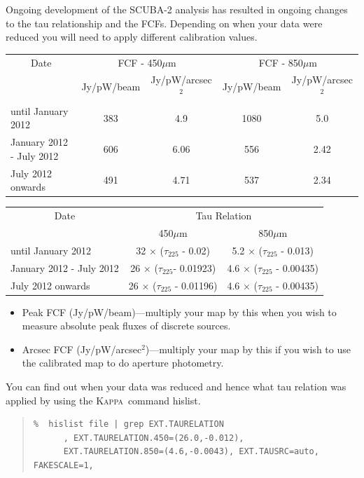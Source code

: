 \documentclass[twoside,11pt]{article}
\newcommand{\xref}[3]{#1}
\renewcommand{\_}{\texttt{\symbol{95}}}
\newenvironment{myquote}{
   \color{MidnightBlue}\begin{quote}\begin{small}}{
   \end{small}\end{quote}
}
\newcommand{\Kappa}{\xref{\textsc{Kappa}}{sun95}{}}
\newcommand{\task}[1]{\textsf{#1}}
\newcommand{\hislist}{\xref{\task{hislist}}{sun95}{HISLIST}}
\renewenvironment{myquote}{
      \begin{quote}\begin{small}}{
      \end{small}\end{quote}
   }
\begin{document}
Ongoing development of the SCUBA-2 analysis has resulted in ongoing
changes to the tau relationship and the FCFs. Depending on when your
data were reduced you will need to apply different calibration values.
\\
\begin{table}[h!]
\begin{center}
\begin{tabular}{|l|c|c|c|c|}
 \hline
 \multicolumn{1}{|c|}{Date} &
 \multicolumn{2}{c|}{FCF - 450$\mu$m} &
 \multicolumn{2}{c|}{FCF - 850$\mu$m} \\
\cline{2-5}
& Jy/pW/beam &Jy/pW/arcsec$^2$ & Jy/pW/beam &Jy/pW/arcsec$^2$ \\
 \hline
until January 2012 &383  & 4.9&1080 &5.0 \\
January 2012 - July 2012&606&6.06 &556 &2.42 \\
July 2012 onwards&491 &4.71 &537 &2.34 \\
\hline
\end{tabular}
\end{center}
\end{table}
\vspace{-2mm}
\begin{table}[h!]
\begin{center}
\begin{tabular}{|l|c|c|}
 \hline
 \multicolumn{1}{|c}{Date} & \multicolumn{2}{|c|}{Tau Relation}  \\ \cline{2-3}
                           & 450$\mu$m  & 850$\mu$m \\ \hline
until January 2012       & 32 $\times$ ($\tau_{225}$ - 0.02)    & 5.2 $\times$ ($\tau_{225}$ - 0.013)  \\
January 2012 - July 2012 & 26 $\times$ ($\tau_{225}$- 0.01923)  & 4.6 $\times$ ($\tau_{225}$ - 0.00435)  \\
July 2012 onwards        & 26 $\times$ ($\tau_{225}$ - 0.01196) & 4.6 $\times$ ($\tau_{225}$ - 0.00435)  \\
\hline
\end{tabular}
\end{center}
\end{table}

\vspace{-5mm}
\begin{itemize}
\item Peak FCF (Jy/pW/beam)---multiply your map by this when you wish
to measure absolute peak fluxes of discrete sources.
\item Arcsec FCF (Jy/pW/arcsec$^2$)---multiply your map by this if
you wish to use the calibrated map to do aperture photometry.
\end{itemize}
You can find out when your data was reduced and hence what tau
relation was applied by using the \Kappa\ command \hislist.
\vspace{-2mm}
\begin{myquote}
\begin{verbatim}
%  hislist file | grep EXT.TAURELATION
      , EXT.TAURELATION.450=(26.0,-0.012),
      EXT.TAURELATION.850=(4.6,-0.0043), EXT.TAUSRC=auto, FAKESCALE=1,
\end{verbatim}
\end{myquote}
\end{document}
